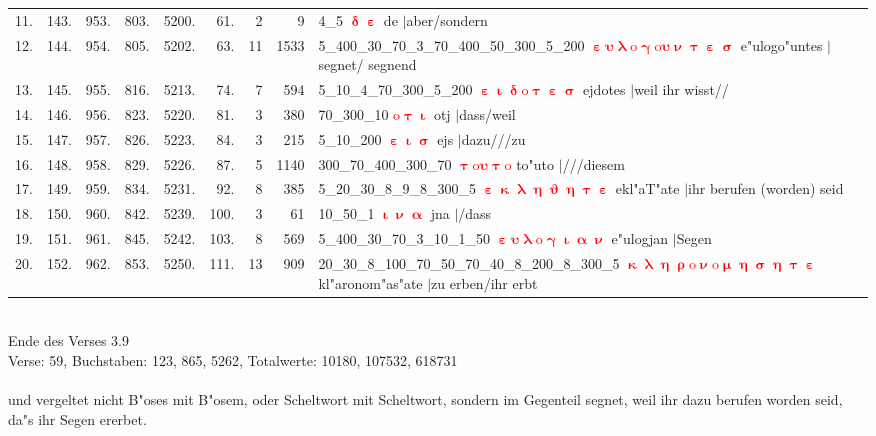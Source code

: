 \documentclass[a4paper,10pt,landscape]{article}
\begin{document}
\begin{tabular}{rrrrrrrrp{120mm}}
11.&143.&953.&803.&5200.&61.&2&9&4\_5 \textcolor{red}{$\boldsymbol{\updelta\upepsilon}$} de $|$aber/sondern\\
12.&144.&954.&805.&5202.&63.&11&1533&5\_400\_30\_70\_3\_70\_400\_50\_300\_5\_200 \textcolor{red}{$\boldsymbol{\upepsilon\upsilon\uplambda\mathrm{o}\upgamma\mathrm{o}\upsilon\upnu\uptau\upepsilon\upsigma}$} e"ulogo"untes $|$segnet/ segnend\\
13.&145.&955.&816.&5213.&74.&7&594&5\_10\_4\_70\_300\_5\_200 \textcolor{red}{$\boldsymbol{\upepsilon\upiota\updelta\mathrm{o}\uptau\upepsilon\upsigma}$} ejdotes $|$weil ihr wisst//\\
14.&146.&956.&823.&5220.&81.&3&380&70\_300\_10 \textcolor{red}{$\boldsymbol{\mathrm{o}\uptau\upiota}$} otj $|$dass/weil\\
15.&147.&957.&826.&5223.&84.&3&215&5\_10\_200 \textcolor{red}{$\boldsymbol{\upepsilon\upiota\upsigma}$} ejs $|$dazu///zu\\
16.&148.&958.&829.&5226.&87.&5&1140&300\_70\_400\_300\_70 \textcolor{red}{$\boldsymbol{\uptau\mathrm{o}\upsilon\uptau\mathrm{o}}$} to"uto $|$///diesem\\
17.&149.&959.&834.&5231.&92.&8&385&5\_20\_30\_8\_9\_8\_300\_5 \textcolor{red}{$\boldsymbol{\upepsilon\upkappa\uplambda\upeta\upvartheta\upeta\uptau\upepsilon}$} ekl"aT"ate $|$ihr berufen (worden) seid\\
18.&150.&960.&842.&5239.&100.&3&61&10\_50\_1 \textcolor{red}{$\boldsymbol{\upiota\upnu\upalpha}$} jna $|$/dass\\
19.&151.&961.&845.&5242.&103.&8&569&5\_400\_30\_70\_3\_10\_1\_50 \textcolor{red}{$\boldsymbol{\upepsilon\upsilon\uplambda\mathrm{o}\upgamma\upiota\upalpha\upnu}$} e"ulogjan $|$Segen\\
20.&152.&962.&853.&5250.&111.&13&909&20\_30\_8\_100\_70\_50\_70\_40\_8\_200\_8\_300\_5 \textcolor{red}{$\boldsymbol{\upkappa\uplambda\upeta\uprho\mathrm{o}\upnu\mathrm{o}\upmu\upeta\upsigma\upeta\uptau\upepsilon}$} kl"aronom"as"ate $|$zu erben/ihr erbt\\
\end{tabular}\medskip \\
Ende des Verses 3.9\\
Verse: 59, Buchstaben: 123, 865, 5262, Totalwerte: 10180, 107532, 618731\\
\\
und vergeltet nicht B"oses mit B"osem, oder Scheltwort mit Scheltwort, sondern im Gegenteil segnet, weil ihr dazu berufen worden seid, da"s ihr Segen ererbet.\\
\end{document}
